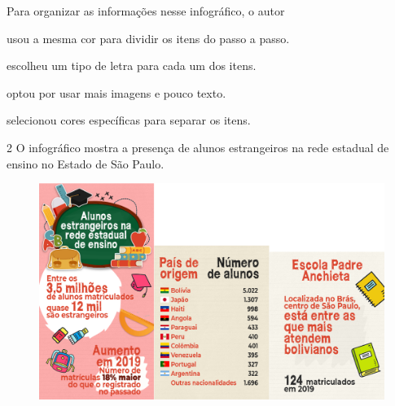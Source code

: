 \begin{conteudo}
\begin{conteudo}
\begin{conteudo}
\begin{conteudo}

Para organizar as informações nesse infográfico, o autor

\begin{escolha}
\item usou a mesma cor para dividir os itens do passo a passo.

\item escolheu um tipo de letra para cada um dos itens.

\item optou por usar mais imagens e pouco texto.

\item selecionou cores específicas para separar os itens.
\end{escolha}

\pagebreak
\num{2} O infográfico mostra a presença de alunos estrangeiros na rede
estadual de ensino no Estado de São Paulo.

\begin{figure}[htpb!]
\centering
\includegraphics[width=\textwidth]{media/image33.jpeg}
\end{figure}



\end{conteudo}
\end{conteudo}
\end{conteudo}
\end{conteudo}
